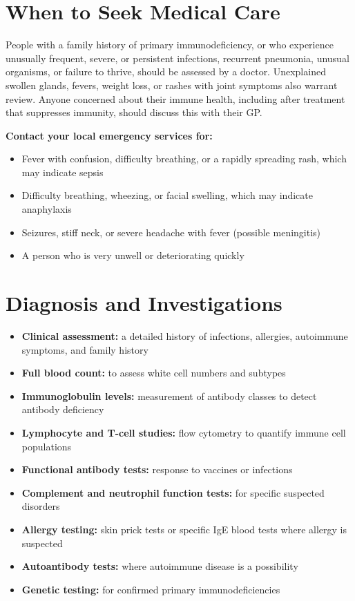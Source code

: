 \section*{When to Seek Medical Care}
People with a family history of primary immunodeficiency, or who experience unusually frequent, severe, or persistent infections, recurrent pneumonia, unusual organisms, or failure to thrive, should be assessed by a doctor. Unexplained swollen glands, fevers, weight loss, or rashes with joint symptoms also warrant review. Anyone concerned about their immune health, including after treatment that suppresses immunity, should discuss this with their GP.

\textbf{Contact your local emergency services for:}
\begin{itemize}
    \item Fever with confusion, difficulty breathing, or a rapidly spreading rash, which may indicate sepsis
    \item Difficulty breathing, wheezing, or facial swelling, which may indicate anaphylaxis
    \item Seizures, stiff neck, or severe headache with fever (possible meningitis)
    \item A person who is very unwell or deteriorating quickly
\end{itemize}

\section*{Diagnosis and Investigations}
\begin{itemize}
    \item \textbf{Clinical assessment:} a detailed history of infections, allergies, autoimmune symptoms, and family history
    \item \textbf{Full blood count:} to assess white cell numbers and subtypes
    \item \textbf{Immunoglobulin levels:} measurement of antibody classes to detect antibody deficiency
    \item \textbf{Lymphocyte and T-cell studies:} flow cytometry to quantify immune cell populations
    \item \textbf{Functional antibody tests:} response to vaccines or infections
    \item \textbf{Complement and neutrophil function tests:} for specific suspected disorders
    \item \textbf{Allergy testing:} skin prick tests or specific IgE blood tests where allergy is suspected
    \item \textbf{Autoantibody tests:} where autoimmune disease is a possibility
    \item \textbf{Genetic testing:} for confirmed primary immunodeficiencies
\end{itemize}

